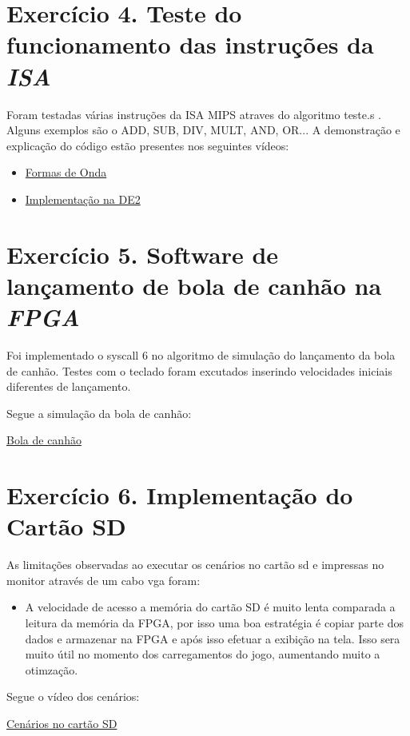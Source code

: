 \documentclass[12pt]{article}
\begin{document}
\section{Exercício 4. Teste do funcionamento das instruções da \textit{ISA} }
\label{sec:testeisa}
Foram testadas várias instruções da ISA MIPS atraves do algoritmo teste.s . Alguns exemplos são o ADD, SUB, DIV, MULT, AND, OR...
A demonstração e explicação do código estão presentes nos seguintes vídeos:

\begin{itemize}
\item \href{https://youtu.be/u5eFv9_BDSw}{Formas de Onda}
\item \href{https://youtu.be/PA9af2_Dhi4}{Implementação na DE2} 
\end{itemize}


\section{Exercício 5. Software de lançamento de bola de canhão na \textit{FPGA}}
\label{sec:canhao}

Foi implementado o syscall 6 no algoritmo de simulação do lançamento da bola de canhão. Testes com o teclado foram excutados inserindo velocidades iniciais diferentes de lançamento.

Segue a simulação da bola de canhão:

\href{https://youtu.be/4IZcH5GzhVk}{Bola de canhão}


\section{Exercício 6. Implementação do Cartão SD}
\label{sec:cartaosd}

As limitações observadas ao executar os cenários no cartão sd e impressas no monitor através de um cabo vga foram:

\begin{itemize}
\item A velocidade de acesso a memória do cartão SD é muito lenta comparada a leitura da memória da FPGA, por isso uma boa estratégia é copiar parte dos dados e armazenar na FPGA e após isso efetuar a exibição na tela. Isso sera muito útil no momento dos carregamentos do jogo, aumentando muito a otimzação. 
\end{itemize} 

Segue o vídeo dos cenários:

\href{https://youtu.be/VeoxltP3L6o}{Cenários no cartão SD}
\end{document}
